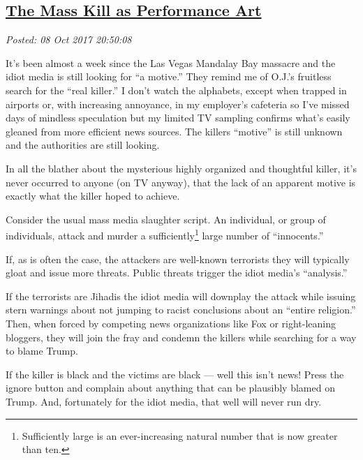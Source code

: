 %

\subsection*{\href{http://analyzethedatanotthedrivel.org/2017/10/08/the-mass-kill-as-performance-art/}{The Mass Kill as Performance Art}}


\noindent\emph{Posted: 08 Oct 2017 20:50:08}
\vspace{6pt}

It's been almost a week since the Las Vegas Mandalay Bay massacre and
the idiot media is still looking for ``a motive.'' They remind me of
O.J.'s fruitless search for the ``real killer.'' I don't watch the
alphabets, except when trapped in airports or, with increasing
annoyance, in my employer's cafeteria so I've missed days of mindless
speculation but my limited TV sampling confirms what's easily gleaned
from more efficient news sources. The killers ``motive'' is still
unknown and the authorities are still looking.

In all the blather about the mysterious highly organized and thoughtful
killer, it's never occurred to anyone (on TV anyway), that the lack of
an apparent motive is exactly what the killer hoped to achieve.

Consider the usual mass media slaughter script. An individual, or group
of individuals, attack and murder a
sufficiently\footnote{Sufficiently large is an ever-increasing natural number that is now
  greater than ten.} large number of ``innocents.''

If, as is often the case, the attackers are well-known terrorists they
will typically gloat and issue more threats. Public threats trigger the
idiot media's ``analysis.''

If the terrorists are Jihadis the idiot media will downplay the attack
while issuing stern warnings about not jumping to racist conclusions
about an ``entire religion.'' Then, when forced by competing news
organizations like Fox or right-leaning bloggers, they will join the
fray and condemn the killers while searching for a way to blame Trump.

If the killer is black and the victims are black --- well this isn't
news! Press the ignore button and complain about anything that can be
plausibly blamed on Trump. And, fortunately for the idiot media, that
well will never run dry.

